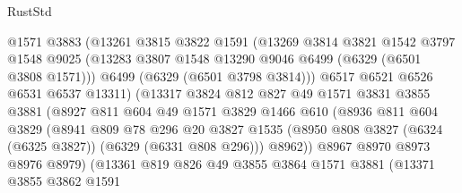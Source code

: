 \begin{lexlean}{RustStd}
\begin{coremodule}
{{                          @1571
                          @3883
                          (@13261
                            @3815
                            @3822
                            @1591
                            (@13269
                              @3814
                              @3821
                              @1542
                              @3797
                              @1548
                              @9025
                              (@13283 @3807 @1548 @13290 @9046 @6499 (@6329 (@6501 @3808 @1571)))
                              @6499
                              (@6329 (@6501 @3798 @3814)))
                            @6517
                            @6521
                            @6526
                            @6531
                            @6537
                            @13311)
                          (@13317
                            @3824
                            @812
                            @827
                            @49
                            @1571
                            @3831
                            @3855
                            @3881
                            (@8927
                              @811
                              @604
                              @49
                              @1571
                              @3829
                              @1466
                              @610
                              (@8936
                                @811
                                @604
                                @3829
                                (@8941
                                  @809
                                  @78
                                  @296
                                  @20
                                  @3827
                                  @1535
                                  (@8950 @808 @3827 (@6324 (@6325 @3827)) (@6329 (@6331 @808 @296)))
                                  @8962))
                              @8967
                              @8970
                              @8973
                              @8976
                              @8979)
                            (@13361
                              @819
                              @826
                              @49
                              @3855
                              @3864
                              @1571
                              @3881
                              (@13371
                                @3855
                                @3862
                                @1591
}}
\end{coremodule}
\end{lexlean}

